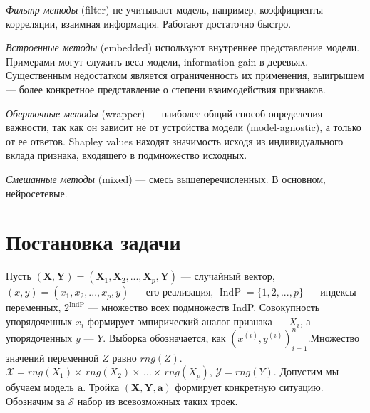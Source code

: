 \documentclass[12pt]{article}
\begin{document}
\emph{Фильтр-методы} (filter) не учитывают модель, например, коэффициенты корреляции, взаимная информация. Работают достаточно быстро.

\emph{Встроенные методы} (embedded) используют внутреннее представление модели. Примерами могут служить веса модели, information gain в деревьях. Существенным недостатком является ограниченность их применения, выигрышем --- более конкретное представление о степени взаимодействия признаков.

\emph{Оберточные методы} (wrapper) --- наиболее общий способ определения важности, так как он зависит не от устройства модели (model-agnostic), а только от ее ответов. Shapley values находят значимость исходя из индивидуального вклада признака, входящего в подмножество исходных.

\emph{Смешанные методы} (mixed) --- смесь вышеперечисленных. В основном, нейросетевые.


\section{Постановка задачи}\label{concepts}

Пусть $(\mathbf{X}, \mathbf{Y}) = (\mathbf{X}_1, \mathbf{X}_2, ..., \mathbf{X}_p, \mathbf{Y})$ --- случайный вектор, $(x, y) = (x_1, x_2, ..., x_p, y)$ --- его реализация, $\operatorname{IndP} = \{1, 2, ..., p\}$ --- индексы переменных, $2^{\operatorname{IndP}}$ --- множество всех подмножеств IndP. Совокупность упорядоченных $x_i$ формирует эмпирический аналог признака --- $X_i$, а упорядоченных $y$ --- $Y$. Выборка обозначается, как $(x^{(i)}, y^{(i)})_{i=1}^{n}$.Множество значений переменной $Z$ равно $rng(Z)$. $\mathcal{X} = rng({X_1}) \times \, rng({X_2}) \times \, \ldots \times \, rng({X_p})$, $\mathcal{Y} = rng(Y)$. Допустим мы обучаем модель $\mathbf{a}$. Тройка $(\mathbf{X}, \mathbf{Y}, \mathbf{a})$ формирует конкретную ситуацию. Обозначим за $\mathcal{S}$ набор из всевозможных таких троек.
\end{document}
